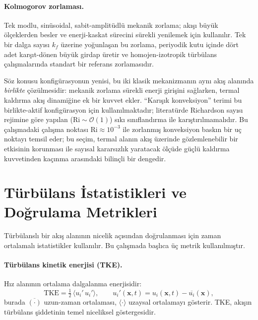 \paragraph{Kolmogorov zorlaması.} Tek modlu, sinüsoidal, sabit-amplitüdlü mekanik zorlama; akışı büyük ölçeklerden besler ve enerji-kaskat sürecini sürekli yenilemek için kullanılır. Tek bir dalga sayısı $k_{f}$ üzerine yoğunlaşan bu zorlama, periyodik kutu içinde dört adet karşıt-dönen büyük girdap üretir ve homojen-izotropik türbülans çalışmalarında standart bir referans zorlamasıdır.

Söz konusu konfigürasyonun yenisi, bu iki klasik mekanizmanın aynı akış alanında \emph{birlikte} çözülmesidir: mekanik zorlama sürekli enerji girişini sağlarken, termal kaldırma akış dinamiğine ek bir kuvvet ekler. ``Karışık konveksiyon'' terimi bu birlikte-aktif konfigürasyon için kullanılmaktadır; literatürde Richardson sayısı rejimine göre yapılan ($\mathrm{Ri}\sim\mathcal{O}(1)$) sıkı sınıflandırma ile karıştırılmamalıdır. Bu çalışmadaki çalışma noktası $\mathrm{Ri}\approx 10^{-3}$ ile zorlanmış konveksiyon baskın bir uç noktayı temsil eder; bu seçim, termal alanın akış üzerinde gözlemlenebilir bir etkisinin korunması ile sayısal kararsızlık yaratacak ölçüde güçlü kaldırma kuvvetinden kaçınma arasındaki bilinçli bir dengedir.

\section{Türbülans İstatistikleri ve Doğrulama Metrikleri}

Türbülanslı bir akış alanının nicelik açısından doğrulanması için zaman ortalamalı istatistikler kullanılır. Bu çalışmada başlıca üç metrik kullanılmıştır.

\paragraph{Türbülans kinetik enerjisi (TKE).} Hız alanının ortalama dalgalanma enerjisidir:
\begin{equation}
\mathrm{TKE} = \tfrac{1}{2}\,\langle u_{i}'\,u_{i}'\rangle,
\qquad u_{i}'(\mathbf{x},t)=u_{i}(\mathbf{x},t)-\overline{u_{i}}(\mathbf{x}),
\label{eq:tke}
\end{equation}
burada $\overline{(\cdot)}$ uzun-zaman ortalaması, $\langle\cdot\rangle$ uzaysal ortalamayı gösterir. TKE, akışın türbülans şiddetinin temel niceliksel göstergesidir.

